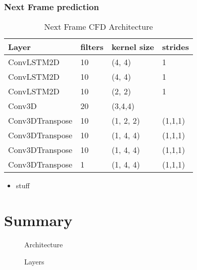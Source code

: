\documentclass{article}
\begin{document}
\subsubsection{Next Frame prediction}

\begin{table}
    \begin{center}
        \caption{Next Frame CFD Architecture}
        \begin{tabular}{l|l|l|l}
            \hline
            Layer & filters & kernel size & strides\\
            \hline
            ConvLSTM2D      & 10 & (4, 4)    & 1\\
            ConvLSTM2D      & 10 & (4, 4)    & 1\\
            ConvLSTM2D      & 10 & (2, 2)    & 1\\

            Conv3D          & 20 & (3,4,4)   &  \\
            Conv3DTranspose & 10 & (1, 2, 2) & (1,1,1)\\
            Conv3DTranspose & 10 & (1, 4, 4) & (1,1,1)\\
            Conv3DTranspose & 10 & (1, 4, 4) & (1,1,1)\\
            Conv3DTranspose &  1 & (1, 4, 4) & (1,1,1)\\
        \end{tabular}

    \end{center}
\end{table}
\begin{itemize}
    \item   stuff
\end{itemize}
\section{Summary}

\begin{figure}
    
    \caption{Architecture}
    \label{fig:anncfdarch}
\end{figure}

\begin{figure}
    
    \caption{Layers}
    \label{fig:test}
\end{figure}
\end{document}
